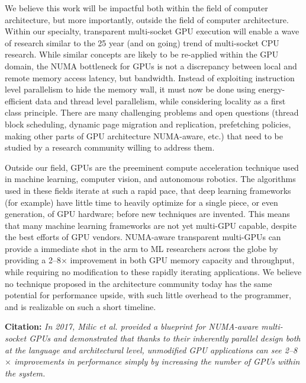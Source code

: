 \documentclass{sig-alternate}
\begin{document}
We believe this work will be impactful both within the field of computer architecture, but 
more importantly, outside the field of computer architecture. Within our 
specialty, transparent multi-socket GPU execution will enable a wave of research 
similar to the 25 year (and on going) trend of multi-socket CPU 
research. While similar concepts are likely to be re-applied within the GPU domain, 
the NUMA bottleneck for GPUs is not a discrepancy between local and remote 
memory access latency, but bandwidth. Instead of exploiting instruction 
level parallelism to hide the memory wall, it must now be done using energy-efficient 
data and thread level parallelism, while considering locality as a first class principle. 
There are many challenging problems and 
open questions (thread block scheduling, dynamic page migration and replication, 
prefetching policies, making other parts of GPU architecture NUMA-aware, etc.\@) 
that need to be studied by a research community willing to address them.

Outside our field,  GPUs are the preeminent compute acceleration technique used in
machine learning, computer vision, and autonomous robotics.  The algorithms
used in these fields iterate at such a rapid pace, that deep learning frameworks (for example)
have little time to heavily optimize for a single piece, or even generation, of GPU hardware;
before new techniques are invented.  This means that many machine learning frameworks
are not yet multi-GPU capable, despite the best efforts of GPU vendors. NUMA-aware
transparent multi-GPUs can provide a immediate shot in the arm to ML researchers
across the globe by providing a 2--8$\times$ improvement in both GPU memory capacity and
throughput, while requiring no modification to these rapidly iterating applications.
We believe no technique proposed in the architecture community today has the same potential
for performance upside, with such little overhead to the programmer, and is realizable on
such a short timeline. 

\textbf{Citation:} \textit{In 2017, Milic et al. provided a blueprint for NUMA-aware
multi-socket GPUs and demonstrated that thanks to their inherently parallel design both at
the language and architectural level, unmodified GPU applications can see 2--8$\times$ improvements 
in performance simply by increasing the number of GPUs within the system.}



\end{document}
